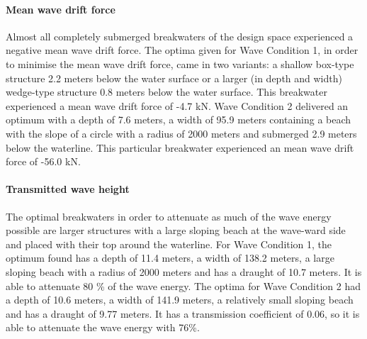 \paragraph{Mean wave drift force} Almost all completely submerged breakwaters of the design space experienced a negative mean wave drift force. The optima given for Wave Condition 1, in order to minimise the mean wave drift force, came in two variants: a shallow box-type structure 2.2 meters below the water surface or a larger (in depth and width) wedge-type structure 0.8 meters below the water surface. This breakwater experienced a mean wave drift force of -4.7 kN. Wave Condition 2 delivered an optimum with a depth of 7.6 meters, a width of 95.9 meters containing a beach with the slope of a circle with a radius of 2000 meters and submerged 2.9 meters below the waterline. This particular breakwater experienced an mean wave drift force of -56.0 kN. 

\paragraph{Transmitted wave height} The optimal breakwaters in order to attenuate as much of the wave energy possible are larger structures with a large sloping beach at the wave-ward side and placed with their top around the waterline. For Wave Condition 1, the optimum found has a depth of 11.4 meters, a width of 138.2 meters, a large sloping beach with a radius of 2000 meters and has a draught of 10.7 meters. It is able to attenuate 80 \% of the wave energy. The optima for Wave Condition 2 had a depth of 10.6 meters, a width of 141.9 meters, a relatively small sloping beach and has a draught of 9.77 meters. It has a transmission coefficient of 0.06, so it is able to attenuate the wave energy with 76\%. 


